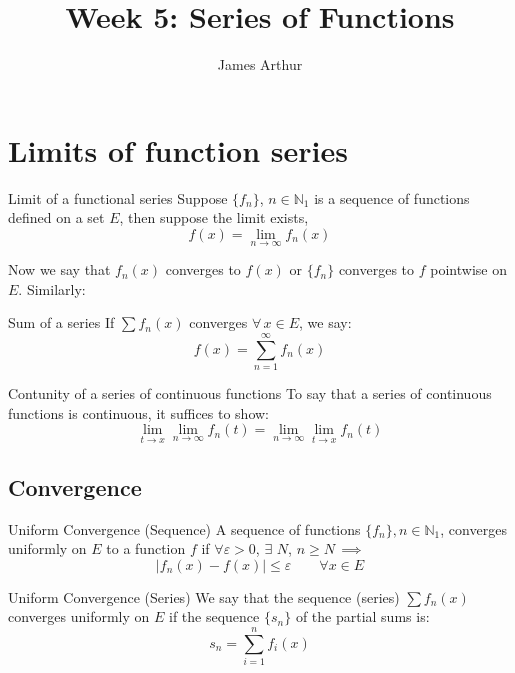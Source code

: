 \documentclass{article}
\title{Week 5: Series of Functions}
\author{James Arthur}
\newcommand{\N}{\mathbb{N}}
\newcommand{\e}{\varepsilon}
\newcommand{\ex}{\exists\,}
\begin{document}
\maketitle
\tableofcontents
\newpage


\section{Limits of function series}

\noindent\begin{definition}{Limit of a functional series}{}
 Suppose $\{ f_n \}$, $n\in\N_1$ is a sequence of functions defined on a set $E$, then suppose the limit exists,
 $$ f(x) = \lim_{n\to\infty}{f_n(x)} $$
\end{definition}\vspace{10pt}

Now we say that $f_n(x)$ converges to $f(x)$ or $\{ f_n \}$ converges to $f$ pointwise on $E$. Similarly:

\noindent\begin{definition}{Sum of a series}{}
   If $\sum f_n(x)$ converges $\forall\, x\in E$, we say:
   $$ f(x) = \sum_{n =1}^\infty {f_n(x)} $$
\end{definition}\vspace{10pt}

\noindent\begin{theorem}{Contunity of a series of continuous functions}{}
  To say that a series of continuous functions is continuous, it suffices to show:
  $$ \lim_{t\to x}{\lim_{n \to \infty}{f_n(t)}} = \lim_{n \to \infty}{\lim_{t\to x}{f_n(t)}}  $$
\end{theorem}\vspace{10pt}


\subsection{Convergence}
\noindent\begin{definition}{Uniform Convergence (Sequence)}{}
   A sequence of functions $\{f_n\}, n\in\N_1$, converges uniformly on $E$ to a function $f$ if $\forall \e>0$, $\ex\,N$, $n \geq N\, \implies$
   $$ |f_n(x) - f(x)| \le \e \qquad \forall x \in E$$
\end{definition}\vspace{10pt}

\noindent\begin{definition}{Uniform Convergence (Series)}{}
   We say that the sequence (series) $\sum f_n(x)$ converges uniformly on $E$ if the sequence $\{ s_n \}$ of the partial sums is:
   $$ s_n = \sum_{i=1}^n {f_i (x)} $$
\end{definition}\vspace{10pt}
\end{document}
